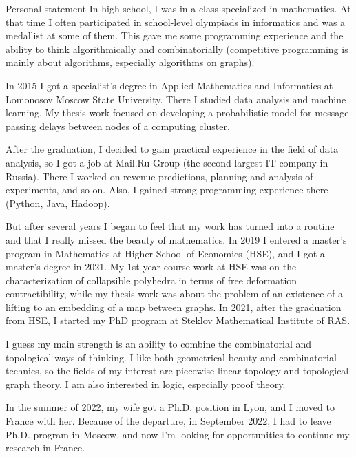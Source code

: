 \documentclass{resume}
\begin{document}
\begin{rSection}{Personal statement}
In high school, I was in a class specialized in mathematics. At that time I often participated in
school-level olympiads in informatics and was a medallist at some of them. This
gave me some programming experience and the ability to think algorithmically and combinatorially
(competitive programming is mainly about algorithms, especially algorithms on graphs).

In 2015 I got a specialist's degree in Applied Mathematics and Informatics at Lomonosov Moscow State
University. There I studied data analysis and machine learning. My thesis work focused on developing
a probabilistic model for message passing delays between nodes of a computing cluster.

After the graduation, I decided to gain practical experience in the field of data analysis, so I got
a job at Mail.Ru Group (the second largest IT company in Russia). There I worked on revenue
predictions, planning and analysis of experiments, and so on. Also, I gained strong programming
experience there (Python, Java, Hadoop).

But after several years I began to feel that my work has turned into a routine and that I really
missed the beauty of mathematics. In 2019 I entered a master's program in Mathematics at
Higher School of Economics (HSE), and I got a master's degree in 2021. My 1st year course work at HSE was on the
characterization of collapsible polyhedra in terms of free deformation contractibility, while my
thesis work was about the problem of an existence of a lifting to an embedding of a map between graphs.
In 2021, after the graduation from HSE, I started my PhD program at Steklov Mathematical Institute
of RAS.

I guess my main strength is an ability to combine the combinatorial and topological ways of
thinking. I like both geometrical beauty and combinatorial technics, so the fields of my interest
are piecewise linear topology and topological graph theory. I am also interested in logic,
especially proof theory.

In the summer of 2022, my wife got a Ph.D. position in Lyon, and I moved to France with her. Because
of the departure, in September 2022, I had to leave Ph.D. program in Moscow, and now I'm looking for
opportunities to continue my research in France.
\end{rSection}
\end{document}
